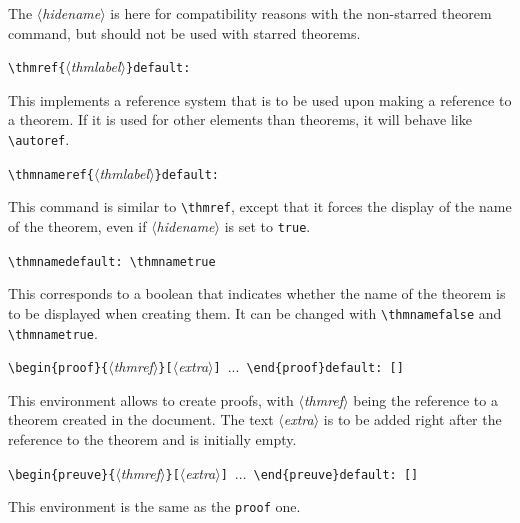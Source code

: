\documentclass[12pt, babellanguage=british, titlespace, defaulttheorems]{altarticle}
\newcommand{\aargt}[1]{\ensuremath{\langle}\textrm{{\emph{#1}}}\ensuremath{\rangle}}
\newcommand{\argt}[1]{\texttt{\{}\ensuremath{\langle}\textrm{{\emph{#1}}}\ensuremath{\rangle}\texttt{\}}}
\newcommand{\optargt}[1]{\texttt{[}\ensuremath{\langle}\textrm{\emph{#1}}\ensuremath{\rangle}\texttt{]}}
\newcommand{\commandline}[1][]{\def\argI{#1}\ccommandline}
\newcommand{\ccommandline}[2][]{\par\medskip\hspace*{-.75cm}\texttt{\textbackslash#2}\argI{}\hfill\if\relax\detokenize{#1}\relax\else\texttt{default:~#1}\fi\par}
\newcommand{\envline}[1][]{\def\argI{#1}\eenvline}
\newcommand{\eenvline}[2][]{\par\medskip\hspace*{-.75cm}\texttt{\textbackslash begin\{#2\}}\argI{}~...~\texttt{\textbackslash end\{#2\}}\hfill\if\relax\detokenize{#1}\relax\else\texttt{default:~#1}\fi\par}
\begin{document}
The \aargt{hidename} is here for compatibility reasons with the non-starred theorem command, but should not be used with starred theorems.
\commandline[\argt{thmlabel}]{thmref}This implements a reference system that is to be used upon making a reference to a theorem. If it is used for other elements than theorems, it will behave like \texttt{\textbackslash autoref}.
\commandline[\argt{thmlabel}]{thmnameref}This command is similar to \texttt{\textbackslash thmref}, except that it forces the display of the name of the theorem, even if \aargt{hidename} is set to \texttt{true}.
\commandline[][\textbackslash thmnametrue]{thmname}This corresponds to a boolean that indicates whether the name of the theorem is to be displayed when creating them. It can be changed with \texttt{\textbackslash thmnamefalse} and \texttt{\textbackslash thmnametrue}.
\envline[\argt{thmref}\optargt{extra}][{[]}]{proof}This environment allows to create proofs, with \aargt{thmref} being the reference to a theorem created in the document. The text \aargt{extra} is to be added right after the reference to the theorem and is initially empty.
\envline[\argt{thmref}\optargt{extra}][{[]}]{preuve}This environment is the same as the \texttt{proof} one.
\end{document}
